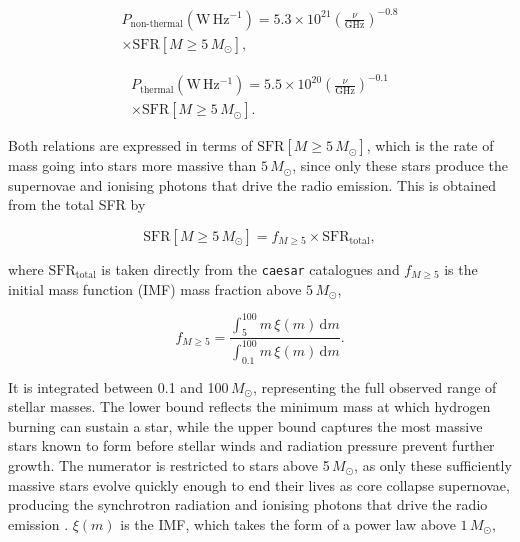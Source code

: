 \documentclass[
    a4paper, %
    10pt, %
    unnumberedsections, %
]{LTJournalArticle}
\begin{document}
\begin{multline}
    P_{\mathrm{non\text{-}thermal}} (\mathrm{W\,Hz^{-1}})
= 5.3 \times 10^{21}
\left(\frac{\nu}{\mathrm{GHz}}\right)^{-0.8} \\
\times \mathrm{SFR}[M \geq 5\,M_\odot],
\label{eq:nonThermalRadio}
\end{multline}

\begin{multline}
P_{\mathrm{thermal}} (\mathrm{W\,Hz^{-1}})
= 5.5 \times 10^{20}
\left(\frac{\nu}{\mathrm{GHz}}\right)^{-0.1} \\
\times \mathrm{SFR}[M \geq 5\,M_\odot].
\label{eq:thermalRadio}
\end{multline}

\noindent Both relations are expressed in terms of $\mathrm{SFR}[M \geq 5\,M_\odot]$, which is the rate of mass going into stars more massive than $5\,M_\odot$, since only these stars produce the supernovae and ionising photons that drive the radio emission. This is obtained from the total SFR by

\begin{equation}
    \mathrm{SFR}[M \geq 5\,M_\odot] = f_{M \geq 5} \times \mathrm{SFR_{total}},
\end{equation}

\noindent where $\mathrm{SFR_{total}}$ is taken directly from the \texttt{caesar} catalogues and $f_{M \geq 5}$ is the initial mass function (IMF) mass fraction above $5\,M_\odot$,

\begin{equation}
    f_{M \geq 5} = \frac{\int_{5}^{100}m\,\xi(m)\,\mathrm{d}m}{\int_{0.1}^{100}m\,\xi(m)\,\mathrm{d}m}.
    \label{eq:chabrierMassFraction}
\end{equation}

\noindent It is integrated between 0.1 and 100\,$M_\odot$, representing the full observed range of stellar masses. The lower bound reflects the minimum mass at which hydrogen burning can sustain a star, while the upper bound captures the most massive stars known to form before stellar winds and radiation pressure prevent further growth. The numerator is restricted to stars above 5\,$M_\odot$, as only these sufficiently massive stars evolve quickly enough to end their lives as core collapse supernovae, producing the synchrotron radiation and ionising photons that drive the radio emission \parencite{bietenholzRadioLuminosityrisetimeFunction2021}. $\xi(m)$ is the \cite{chabrierGalacticStellarSubstellar2003} IMF, 
which takes the form of a power law above $1\,M_\odot$,
\end{document}
